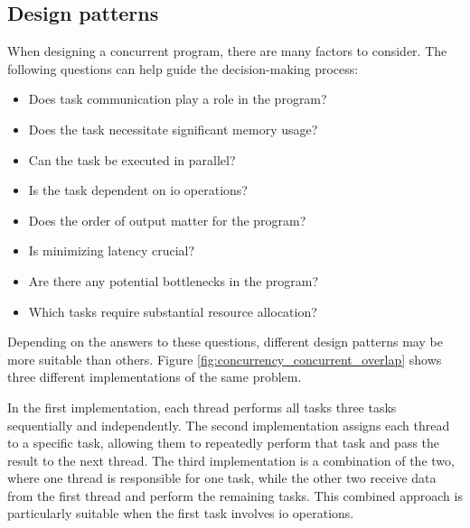 \subsection{Design patterns}
When designing a concurrent program, there are many factors to consider. The following questions can help guide the decision-making process:

\begin{itemize}
    \item Does task communication play a role in the program?
    \item Does the task necessitate significant memory usage?
    \item Can the task be executed in parallel?
    \item Is the task dependent on \gls{io} operations?
    \item Does the order of output matter for the program?
    \item Is minimizing latency crucial?
    \item Are there any potential bottlenecks in the program?
    \item Which tasks require substantial resource allocation?
\end{itemize}

Depending on the answers to these questions, different design patterns may be more suitable than others.
Figure \ref{fig:concurrency_concurrent_overlap} shows three different implementations of the same problem.

In the first implementation, each thread performs all tasks three tasks sequentially and independently.
The second implementation assigns each thread to a specific task, allowing them to repeatedly perform that task and pass the result to the next thread.
The third implementation is a combination of the two, where one thread is responsible for one task, while the other two receive data from the first thread and perform the remaining tasks.
This combined approach is particularly suitable when the first task involves \gls{io} operations.


